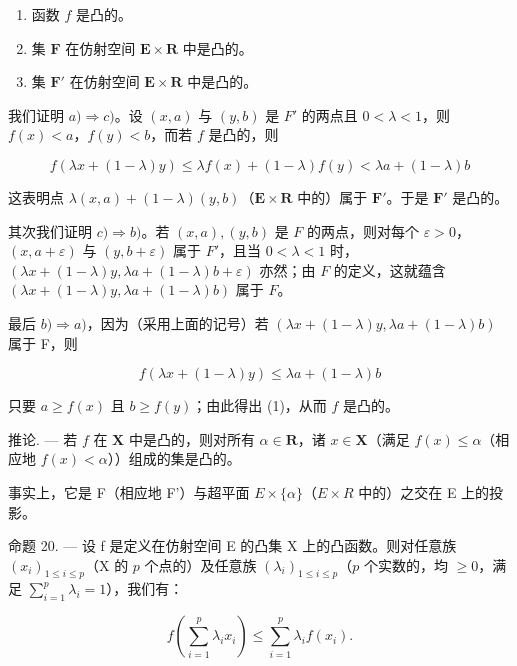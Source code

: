 \begin{enumerate}
\def\labelenumi{\alph{enumi})}
\item
  函数 \(f\) 是凸的。
\item
  集 \(\mathbf{F}\) 在仿射空间 \(\mathbf{E} \times \mathbf{R}\) 中是凸的。
\item
  集 \(\mathbf{F}'\) 在仿射空间 \(\mathbf{E} \times \mathbf{R}\) 中是凸的。
\end{enumerate}

我们证明 \(a) \Rightarrow c)\)。设 \((x, a)\) 与 \((y, b)\) 是 \(F'\) 的两点且 \(0 < \lambda < 1\)，则 \(f(x) < a\)，\(f(y) < b\)，而若 \(f\) 是凸的，则

\[
f (\lambda x + (1 - \lambda) y) \leqslant \lambda f (x) + (1 - \lambda) f (y) <   \lambda a + (1 - \lambda) b
\]

这表明点 \(\lambda(x, a) + (1 - \lambda)(y, b)\)（\(\mathbf{E} \times \mathbf{R}\) 中的）属于 \(\mathbf{F}'\)。于是 \(\mathbf{F}'\) 是凸的。

其次我们证明 \(c) \Rightarrow b)\)。若 \((x, a), (y, b)\) 是 \(F\) 的两点，则对每个 \(\varepsilon > 0\)，\((x, a + \varepsilon)\) 与 \((y, b + \varepsilon)\) 属于 \(F'\)，且当 \(0 < \lambda < 1\) 时，\((\lambda x + (1 - \lambda)y, \lambda a + (1 - \lambda)b + \varepsilon)\) 亦然；由 \(F\) 的定义，这就蕴含 \((\lambda x + (1 - \lambda)y, \lambda a + (1 - \lambda)b)\) 属于 \(F\)。

最后 \(b) \Rightarrow a)\)，因为（采用上面的记号）若 \((\lambda x + (1 - \lambda)y, \lambda a + (1 - \lambda)b)\) 属于 F，则

\[
f (\lambda x + (1 - \lambda) y) \leqslant \lambda a + (1 - \lambda) b
\]

只要 \(a \geqslant f(x)\) 且 \(b \geqslant f(y)\)；由此得出 (1)，从而 \(f\) 是凸的。

推论. --- 若 \(f\) 在 \(\mathbf{X}\) 中是凸的，则对所有 \(\alpha \in \mathbf{R}\)，诸 \(x \in \mathbf{X}\)（满足 \(f(x) \leqslant \alpha\)（相应地 \(f(x) < \alpha\)））组成的集是凸的。

事实上，它是 F（相应地 F'）与超平面 \(E \times \{\alpha\}\)（\(E \times R\) 中的）之交在 E 上的投影。

命题 20. --- 设 f 是定义在仿射空间 E 的凸集 X 上的凸函数。则对任意族 \((x_{i})_{1\leqslant i\leqslant p}\)（X 的 \(p\) 个点的）及任意族 \((\lambda_{i})_{1\leqslant i\leqslant p}\)（\(p\) 个实数的，均 \(\geqslant 0\)，满足 \(\sum_{i = 1}^{p}\lambda_{i} = 1\)），我们有：

\[
f \left(\sum_ {i = 1} ^ {p} \lambda_ {i} x _ {i}\right) \leqslant \sum_ {i = 1} ^ {p} \lambda_ {i} f \left(x _ {i}\right).\tag{3}
\]

